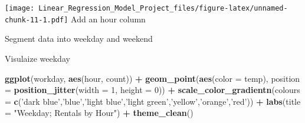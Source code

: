 \documentclass[]{article}
\newenvironment{Shaded}{\begin{snugshade}}{\end{snugshade}}
\newcommand{\KeywordTok}[1]{\textcolor[rgb]{0.13,0.29,0.53}{\textbf{#1}}}
\newcommand{\DataTypeTok}[1]{\textcolor[rgb]{0.13,0.29,0.53}{#1}}
\newcommand{\DecValTok}[1]{\textcolor[rgb]{0.00,0.00,0.81}{#1}}
\newcommand{\StringTok}[1]{\textcolor[rgb]{0.31,0.60,0.02}{#1}}
\newcommand{\ControlFlowTok}[1]{\textcolor[rgb]{0.13,0.29,0.53}{\textbf{#1}}}
\newcommand{\OperatorTok}[1]{\textcolor[rgb]{0.81,0.36,0.00}{\textbf{#1}}}
\newcommand{\NormalTok}[1]{#1}
\begin{document}
\texttt{[image: Linear\_Regression\_Model\_Project\_files/figure-latex/unnamed-chunk-11-1.pdf]}
Add an hour column

\begin{Shaded}
\end{Shaded}

Segment data into weekday and weekend

\begin{Shaded}
\end{Shaded}

Visulaize weekday

\begin{Shaded}
\begin{Highlighting}[]
\KeywordTok{ggplot}\NormalTok{(workday, }\KeywordTok{aes}\NormalTok{(hour, count)) }\OperatorTok{+}
\StringTok{    }\KeywordTok{geom_point}\NormalTok{(}\KeywordTok{aes}\NormalTok{(}\DataTypeTok{color =}\NormalTok{ temp), }\DataTypeTok{position =} \KeywordTok{position_jitter}\NormalTok{(}\DataTypeTok{width =} \DecValTok{1}\NormalTok{, }\DataTypeTok{height =} \DecValTok{0}\NormalTok{)) }\OperatorTok{+}
\StringTok{    }\KeywordTok{scale_color_gradientn}\NormalTok{(}\DataTypeTok{colours =} \KeywordTok{c}\NormalTok{(}\StringTok{'dark blue'}\NormalTok{,}\StringTok{'blue'}\NormalTok{,}\StringTok{'light blue'}\NormalTok{,}\StringTok{'light green'}\NormalTok{,}\StringTok{'yellow'}\NormalTok{,}\StringTok{'orange'}\NormalTok{,}\StringTok{'red'}\NormalTok{)) }\OperatorTok{+}
\StringTok{    }\KeywordTok{labs}\NormalTok{(}\DataTypeTok{title =} \StringTok{"Weekday; Rentals by Hour"}\NormalTok{) }\OperatorTok{+}
\StringTok{    }\KeywordTok{theme_clean}\NormalTok{()}
\end{Highlighting}
\end{Shaded}
\end{document}
